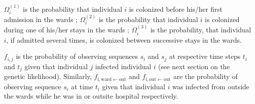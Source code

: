 \documentclass[10pt]{article}
\begin{document}
$\Omega_i^{\left(1\right)}$ is the probability that individual $i$ is colonized before his/her first admission in the wards ; $\Omega_i^{\left(2\right)}$ is the probability that individual $i$ is colonized during one of his/her stays in the wards ; $\Omega_i^{\left(3\right)}$ is the probability, that individual $i$, if admitted several times, is colonized between successive stays in the wards.

$f_{i,j}$ is the probability of observing sequences $s_i$ and $s_j$ at respective time steps $t_i$ and $t_j$ given that individual $j$ infected individual $i$ (see next section on the genetic likelihood). Similarly, $f_{\text{i},\text{ward} \leftarrow \text{out}}$ and $f_{\text{i},\text{out} \leftarrow \text{out}}$ are the probability of observing sequence $s_i$ at time $t_i$ given that individual $i$ was infected from outside the wards while he was in or outsite hospital respectively. 
\end{document}
